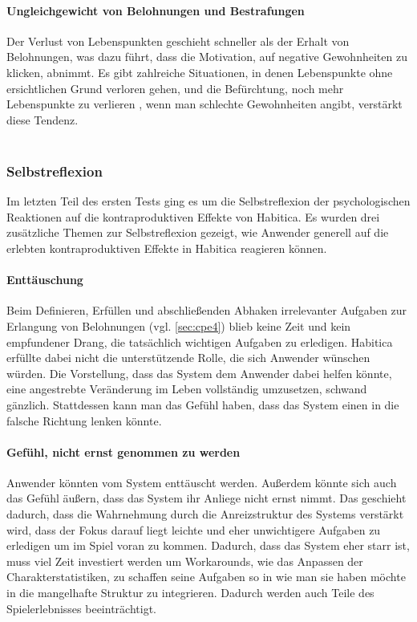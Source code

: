 \documentclass[sigconf, nonacm]{acmart}
\begin{document}
\paragraph{Ungleichgewicht von Belohnungen und Bestrafungen}\label{sec:acpe4}
Der Verlust von Lebenspunkten geschieht schneller als der Erhalt von Belohnungen, was dazu führt, dass die Motivation, auf negative Gewohnheiten zu klicken, abnimmt. Es gibt zahlreiche Situationen, in denen Lebenspunkte ohne ersichtlichen Grund verloren gehen, und die Befürchtung, noch mehr Lebenspunkte zu verlieren , wenn man schlechte Gewohnheiten angibt, verstärkt diese Tendenz. 
\\
\\
\subsubsection{Selbstreflexion}
Im letzten Teil des ersten Tests ging es um die Selbstreflexion der psychologischen Reaktionen auf die kontraproduktiven Effekte von Habitica. Es wurden drei zusätzliche Themen zur Selbstreflexion gezeigt, wie Anwender generell auf die erlebten kontraproduktiven Effekte in Habitica reagieren können.

\paragraph{Enttäuschung}\label{sec:sr1}
Beim Definieren, Erfüllen und abschließenden Abhaken irrelevanter Aufgaben zur Erlangung von Belohnungen (vgl. \ref{sec:cpe4}) blieb keine Zeit und kein empfundener Drang, die tatsächlich wichtigen Aufgaben zu erledigen. Habitica erfüllte dabei nicht die unterstützende Rolle, die sich Anwender wünschen würden. Die Vorstellung, dass das System dem Anwender dabei helfen könnte, eine angestrebte Veränderung im Leben vollständig umzusetzen, schwand gänzlich. Stattdessen kann man das Gefühl haben, dass das System einen in die falsche Richtung lenken könnte.

\paragraph{Gefühl, nicht ernst genommen zu werden}\label{sec:sr2}
Anwender könnten vom System enttäuscht werden. Außerdem könnte sich auch das Gefühl äußern, dass das System ihr Anliege nicht ernst nimmt. Das geschieht dadurch, dass die Wahrnehmung durch die Anreizstruktur des Systems verstärkt wird, dass der Fokus darauf liegt leichte und eher unwichtigere Aufgaben zu erledigen um im Spiel voran zu kommen. 
Dadurch, dass das System eher starr ist, muss viel Zeit investiert werden um Workarounds, wie das Anpassen der Charakterstatistiken, zu schaffen seine Aufgaben so in wie man sie haben möchte in die mangelhafte Struktur zu integrieren. Dadurch werden auch Teile des Spielerlebnisses beeinträchtigt.
\end{document}
